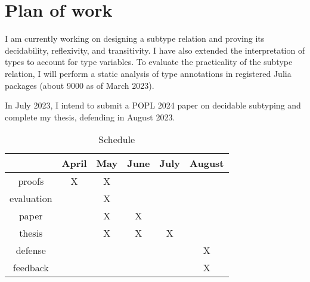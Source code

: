 \chapter{Plan of work}\label{chap:6}

I am currently working on designing a subtype relation
and proving its decidability, reflexivity, and transitivity.
I have also extended the interpretation of types to account for type variables.
To evaluate the practicality of the subtype relation,
I will perform a static analysis of type annotations in registered Julia
packages (about 9000 as of March 2023).

In July 2023, I intend to submit a POPL 2024 paper on decidable subtyping
and complete my thesis, defending in August 2023.

\begin{table}[h]
  \caption{Schedule}
  \vspace*{0.25em}
  \centering\footnotesize
  \begin{tabular}{c|ccccc}
  \toprule
  & April & May & June & July & August \\
  \midrule
  proofs & X & X & & & \\
  evaluation & & X & & & \\
  paper & & X & X & & \\
  thesis & & X & X & X & \\
  defense & & & & & X \\
  feedback & & & & & X \\
  \end{tabular}
  \end{table}




